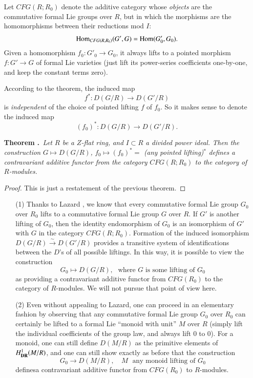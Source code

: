 Let $CFG(R;R_{0})$ denote the additive category whose {\em objects} are the commutative formal Lie groups over $R$, but in which the morphisms are the homomorphisms between their reductions mod $I$:
$$
\operatorname{Hom}_{CFG(R,R_{0})}(G',G)=\operatorname{Hom}(G'_{0},G_{0}).
$$
Given a homomorphism $f_{0}:G'_{0}\to G_{0}$, it always lifts to a pointed morphism\pageoriginale $f:G'\to G$ of formal Lie varieties (just lift its power-series coefficients one-by-one, and keep the constant terms zero).

According to the theorem, the induced map
$$
f^{*}:D(G/R)\to D(G'/R)
$$
is {\em independent} of the choice of pointed lifting $f$ of $f_{0}$. So it makes sense to denote the induced map
$$
(f_{0})^{*}:D(G/R)\to D(G'/R).
$$

\medskip
\noindent
{\bf Theorem .\label{art6-thm5.1.5}}~{\em Let $R$ be a $Z$-flat ring, and $I\subset R$ a divided power ideal. Then the construction $G\mapsto D(G/R)$, $f_{0}\mapsto (f_{0})^{*}=$ (any pointed lifting)$^{*}$ defines a contravariant additive functor from the category $CFG(R;R_{0})$ to the category of $R$-modules.}
\smallskip

\begin{proof}
This is just a restatement of the previous theorem.
\end{proof}

\begin{remarks*}
\begin{itemize}
\item[(1)] Thanks to Lazard \cite{art6-key33}, we know that every commutative formal Lie group $G_{0}$ over $R_{0}$ lifts to a commutative formal Lie group $G$ over $R$. If $G'$ is another lifting of $G_{0}$, then the identity endomorphism of $G_{0}$ is an isomorphism of $G'$ with $G$ in the category $CFG(R;R_{0})$. Formation of the induced isomorphism $D(G/R)\xrightarrow{\sim}D(G'/R)$ provides a transitive system of identifications between the $D$'s of all possible liftings. In this way, it is possible to view the construction
$$
G_{0}\mapsto D(G/R),\text{~ where $G$ is some lifting of $G_{0}$}
$$
as providing a contravariant additive functor from $CFG(R_{0})$ to the category of $R$-modules. We will not pursue that point of view here.

\item[(2)] Even without appealing to Lazard, one can proceed in an elementary fashion by observing that any commutative formal Lie group $G_{0}$ over $R_{0}$ can certainly be lifted to a formal Lie ``monoid with unit'' $M$ over $R$ (simply lift the individual coefficients of the group law, and always lift $0$ to $0$). For a monoid, one can still define $D(M/R)$ as the primitive elements of $H^{1}_{\mathbf{DR}}(M/R)$, and one can still show exactly as before that the construction
$$
G_{0}\to D(M/R),\quad M\text{~ any monoid lifting of $G_{0}$}
$$
defines\pageoriginale a contravariant additive functor from $CFG(R_{0})$ to $R$-modules.
\end{itemize}
\end{remarks*}

